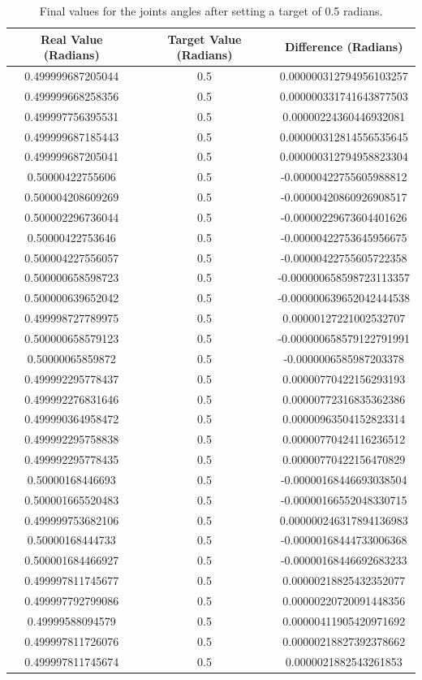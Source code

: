 \documentclass[12pt,oneside]{article}
\begin{document}
\begin{table}[H]
\centering
\begin{tabular}{c|c|c}
\hline
Real Value (Radians) & Target Value (Radians) & Difference (Radians) \\
\hline
0.499999687205044 & 0.5 & 0.000000312794956103257 \\
0.499999668258356 & 0.5 & 0.000000331741643877503 \\
0.499997756395531 & 0.5 & 0.00000224360446932081 \\
0.499999687185443 & 0.5 & 0.000000312814556535645 \\
0.499999687205041 & 0.5 & 0.000000312794958823304 \\
0.50000422755606 & 0.5 & -0.00000422755605988812 \\
0.500004208609269 & 0.5 & -0.00000420860926908517 \\
0.500002296736044 & 0.5 & -0.00000229673604401626 \\
0.50000422753646 & 0.5 & -0.00000422753645956675 \\
0.500004227556057 & 0.5 & -0.00000422755605722358 \\
0.500000658598723 & 0.5 & -0.000000658598723113357 \\
0.500000639652042 & 0.5 & -0.000000639652042444538 \\
0.499998727789975 & 0.5 & 0.00000127221002532707 \\
0.500000658579123 & 0.5 & -0.000000658579122791991 \\
0.50000065859872 & 0.5 & -0.0000006585987203378 \\
0.499992295778437 & 0.5 & 0.00000770422156293193 \\
0.499992276831646 & 0.5 & 0.00000772316835362386 \\
0.499990364958472 & 0.5 & 0.00000963504152823314 \\
0.499992295758838 & 0.5 & 0.00000770424116236512 \\
0.499992295778435 & 0.5 & 0.00000770422156470829 \\
0.50000168446693 & 0.5 & -0.00000168446693038504 \\
0.500001665520483 & 0.5 & -0.00000166552048330715 \\
0.499999753682106 & 0.5 & 0.000000246317894136983 \\
0.50000168444733 & 0.5 & -0.00000168444733006368 \\
0.500001684466927 & 0.5 & -0.00000168446692683233 \\
0.499997811745677 & 0.5 & 0.00000218825432352077 \\
0.499997792799086 & 0.5 & 0.00000220720091448356 \\
0.49999588094579 & 0.5 & 0.00000411905420971692 \\
0.499997811726076 & 0.5 & 0.00000218827392378662 \\
0.499997811745674 & 0.5 & 0.0000021882543261853 \\
\hline
\end{tabular}
\caption{Final values for the joints angles after setting a target of 0.5 radians.}
\label{table:final-angles}
\end{table}
\end{document}
